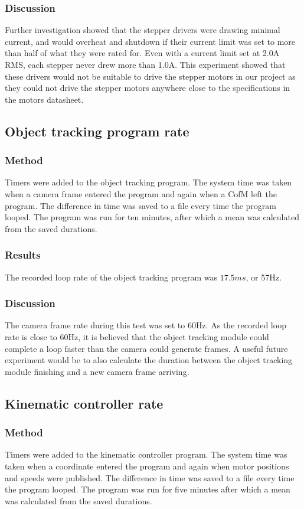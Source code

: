\documentclass[conference]{IEEEtran}
\begin{document}
\subsubsection{Discussion}
Further investigation showed that the stepper drivers were drawing minimal current, and would overheat and shutdown if their current limit was set to more than half of what they were rated for. Even with a current limit set at 2.0A RMS, each stepper never drew more than 1.0A. This experiment showed that these drivers would not be suitable to drive the stepper motors in our project as they could not drive the stepper motors anywhere close to the specifications in the motors datasheet.


\subsection{Object tracking program rate}
\subsubsection{Method}
Timers were added to the object tracking program. The system time was taken when a camera frame entered the program and again when a CofM left the program. The difference in time was saved to a file every time the program looped. The program was run for ten minutes, after which a mean was calculated from the saved durations.
\subsubsection{Results}
The recorded loop rate of the object tracking program was $17.5ms$, or 57Hz.
\subsubsection{Discussion}
The camera frame rate during this test was set to 60Hz. As the recorded loop rate is close to 60Hz, it is believed that the object tracking module could complete a loop faster than the camera could generate frames. A useful future experiment would be to also calculate the duration between the object tracking module finishing and a new camera frame arriving.


\subsection{Kinematic controller rate}
\subsubsection{Method}
Timers were added to the kinematic controller program. The system time was taken when a coordinate entered the program and again when motor positions and speeds were published. The difference in time was saved to a file every time the program looped. The program was run for five minutes after which a mean was calculated from the saved durations.
\end{document}
